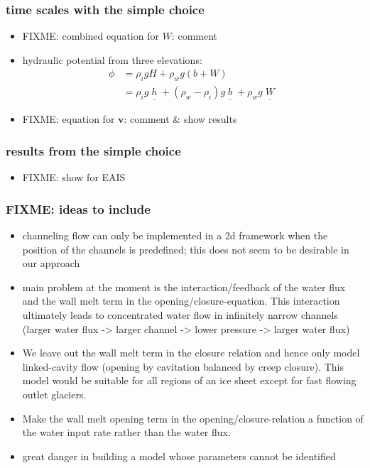 \documentclass[hide notes,intlimits]{beamer}
\begin{document}
\begin{frame}
  \frametitle{time scales with the simple choice}

  \begin{itemize}
    \item FIXME: combined equation for $W$: comment
    \item hydraulic potential from three elevations:
    \begin{align*}
      \phi &= \rho_i g H + \rho_w g (b+W) \\
           &= \rho_i g \underline{\phantom{|}h\phantom{|}} + (\rho_w - \rho_i) g \underline{\phantom{|}b\phantom{|}} + \rho_w g \underline{\phantom{|}W\phantom{|}}
    \end{align*}
    \item FIXME: equation for $\mathbf{v}$: comment \& show results
  \end{itemize}

\end{frame}


\begin{frame}
  \frametitle{results from the simple choice}

  \begin{itemize}
    \item FIXME: show for EAIS
  \end{itemize}

\end{frame}











\begin{frame}
  \frametitle{FIXME: ideas to include}

\scriptsize
  \begin{itemize}
  \item channeling flow can only be implemented in a 2d framework when the position of the channels is predefined; this does not seem to be desirable in our approach
  \item main problem at the moment is the interaction/feedback of the water flux and the wall melt term in the opening/closure-equation. This interaction ultimately leads to concentrated water flow in infinitely narrow channels (larger water flux ->  larger channel -> lower pressure -> larger water flux)
  \item We leave out the wall melt term in the closure relation and hence only model linked-cavity flow (opening by cavitation balanced by creep closure). This model would be suitable for all regions of an ice sheet except for fast flowing outlet glaciers.
  \item Make the wall melt opening term in the opening/closure-relation a function of the water input rate rather than the water flux.
  \item \alert{great danger} in building a model whose parameters cannot be identified
  \end{itemize}
\end{frame}
\end{document}
